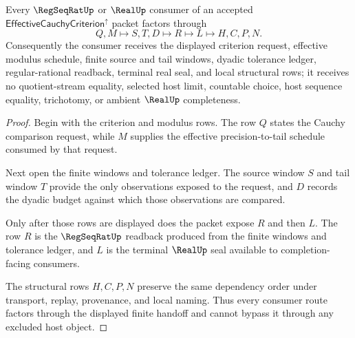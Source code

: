 \begin{theorem}
\label{thm:effective-cauchy-criterion-regseqrat-handoff}
Every $\RegSeqRatUp$ or $\RealUp$ consumer of an accepted $\mathsf{EffectiveCauchyCriterion}^{\uparrow}$ packet factors through
$$
Q,M \longmapsto S,T,D \longmapsto R \longmapsto L \longmapsto H,C,P,N .
$$
Consequently the consumer receives the displayed criterion request, effective modulus schedule, finite source and tail windows, dyadic tolerance ledger, regular-rational readback, terminal real seal, and local structural rows; it receives no quotient-stream equality, selected host limit, countable choice, host sequence equality, trichotomy, or ambient $\RealUp$ completeness.
\end{theorem}
\begin{proof}
Begin with the criterion and modulus rows. The row $Q$ states the Cauchy comparison request, while $M$ supplies the effective precision-to-tail schedule consumed by that request.

Next open the finite windows and tolerance ledger. The source window $S$ and tail window $T$ provide the only observations exposed to the request, and $D$ records the dyadic budget against which those observations are compared.

Only after those rows are displayed does the packet expose $R$ and then $L$. The row $R$ is the $\RegSeqRatUp$ readback produced from the finite windows and tolerance ledger, and $L$ is the terminal $\RealUp$ seal available to completion-facing consumers.

The structural rows $H,C,P,N$ preserve the same dependency order under transport, replay, provenance, and local naming. Thus every consumer route factors through the displayed finite handoff and cannot bypass it through any excluded host object.
\end{proof}


